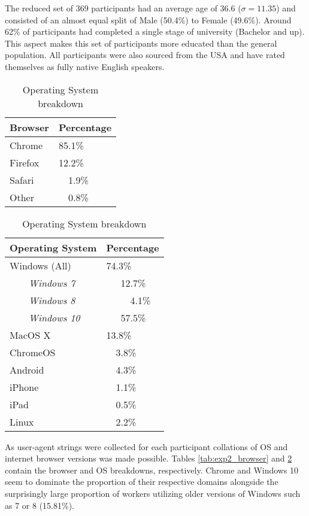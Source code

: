 The reduced set of 369 participants had an average age of 36.6 ($\sigma = 11.35$) and consisted of an almost equal split of Male (50.4\%) to Female (49.6\%). Around 62\% of participants had completed a single stage of university (Bachelor and up). This aspect makes this set of participants more educated than the general population. All participants were also sourced from the USA and have rated themselves as fully native English speakers.
\begin{table}[!h]
    \centering
    \begin{tabular}{|l|l|}
        \hline
        Browser & Percentage \\
        \hline
        Chrome & 85.1\% \\
        Firefox & 12.2\% \\
        Safari & ~~1.9\% \\
        Other & ~~0.8\% \\
        \hline
    \end{tabular}
    \caption{Internet Browser breakdown}
    \label{tab:exp2_browser}
    \begin{tabular}{|l|l|}
        \hline
        Operating System & Percentage \\
        \hline
        
        \hline
        Windows (All) & 74.3\% \\
        ~~~~\textit{Windows 7} & ~~~12.7\% \\
        ~~~~\textit{Windows 8} & ~~~~~4.1\% \\
        ~~~~\textit{Windows 10} & ~~~57.5\% \\
        MacOS X	 & 13.8\% \\
        ChromeOS & ~~3.8\% \\
        Android	& ~~4.3\% \\
        iPhone	& ~~1.1\% \\
        iPad	& ~~0.5\% \\
        Linux	& ~~2.2\% \\
        \hline
    \end{tabular}
    \caption{Operating System breakdown}
    \label{tab:exp2_os}
\end{table}
    
As user-agent strings were collected for each participant collations of OS and internet browser versions was made possible. Tables \ref{tab:exp2_browser} and \ref{tab:exp2_os} contain the browser and OS breakdowns,  respectively. Chrome and Windows 10 seem to dominate the proportion of their respective domains alongside the surprisingly large proportion of workers utilizing older versions of Windows such as 7 or 8 (15.81\%).

